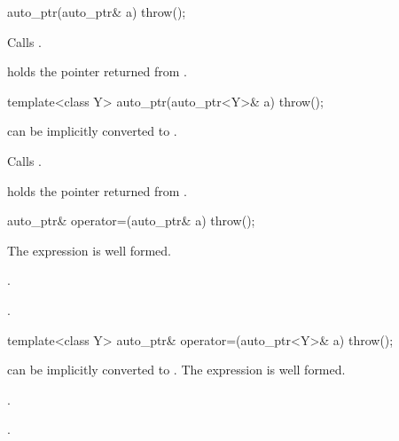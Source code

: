 %
\begin{itemdecl}
auto_ptr(auto_ptr& a) throw();
\end{itemdecl}

\begin{itemdescr}
\pnum
\effects
Calls .

\pnum
\postconditions
{} holds the pointer returned from .
\end{itemdescr}

%
\begin{itemdecl}
template<class Y> auto_ptr(auto_ptr<Y>& a) throw();
\end{itemdecl}

\begin{itemdescr}
\pnum
\requires
{} can be implicitly converted to .

\pnum
\effects
Calls .

\pnum
\postconditions
{} holds the pointer returned from .
\end{itemdescr}

%
\begin{itemdecl}
auto_ptr& operator=(auto_ptr& a) throw();
\end{itemdecl}

\begin{itemdescr}
\pnum
\requires
The expression  is well formed.

\pnum
\effects
{}.

\pnum
\returns
{}.
\end{itemdescr}

%
%
\begin{itemdecl}
template<class Y> auto_ptr& operator=(auto_ptr<Y>& a) throw();
\end{itemdecl}

\begin{itemdescr}
\pnum
\requires
{} can be implicitly converted to . The expression
 is well formed.

\pnum
\effects
{}.

\pnum
\returns
{}.
\end{itemdescr}

